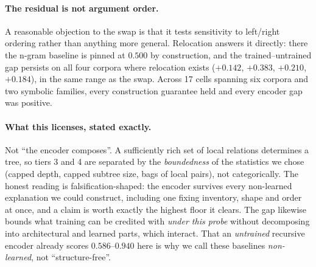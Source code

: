 \paragraph{The residual is not argument order.} A reasonable objection to the swap is that it tests
sensitivity to left/right ordering rather than anything more general. Relocation answers it directly:
there the n-gram baseline is pinned at $0.500$ by construction, and the trained--untrained gap
persists on all four corpora where relocation exists ($+0.142$, $+0.383$, $+0.210$, $+0.184$), in the
same range as the swap. Across 17 cells spanning six corpora and two symbolic families, every
construction guarantee held and every encoder gap was positive.

\paragraph{What this licenses, stated exactly.} Not ``the encoder composes''. A sufficiently rich set
of local relations determines a tree, so tiers 3 and 4 are separated by the \emph{boundedness} of the
statistics we chose (capped depth, capped subtree size, bags of local pairs), not categorically.
The honest reading is falsification-shaped: the encoder survives every non-learned explanation we
could construct, including one fixing inventory, shape and order at once, and a claim is worth
exactly the highest floor it clears. The gap likewise bounds what training can be credited with
\emph{under this probe} without decomposing into architectural and learned parts, which interact.
That an \emph{untrained} recursive encoder already scores $0.586$--$0.940$ here is why we call these
baselines \emph{non-learned}, not ``structure-free''.
